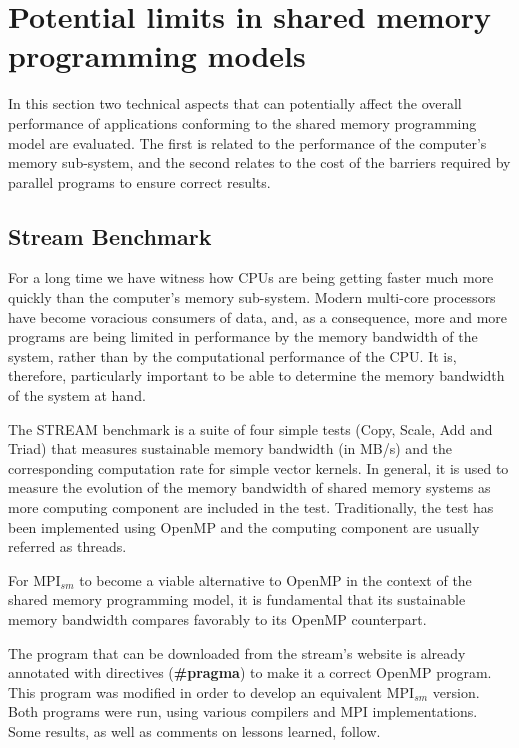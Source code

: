 \section{Potential limits in shared memory programming models} \label{potentialLimits}

In this section two technical aspects that can potentially affect the overall performance of applications conforming to the shared memory programming model are evaluated. The first is related to the performance of the computer's memory sub-system, and the second relates to the cost of the barriers required by parallel programs to ensure correct results.


\subsection*{Stream Benchmark}

For a long time we have witness how CPUs are being getting faster much more quickly than the computer's memory sub-system. Modern multi-core processors have become voracious consumers of data, and, as a consequence, more and more programs are being limited in performance by the memory bandwidth of the system, rather than by the computational performance of the CPU\cite{McCalpin2007}. It is, therefore, particularly important to be able to determine the memory bandwidth of the system at hand. 

\medskip


The STREAM benchmark\cite{McCalpin2007} is a suite of four simple tests (Copy, Scale, Add and Triad) that measures sustainable memory bandwidth (in MB/s) and the corresponding computation rate for simple vector kernels. In general, it is used to measure the evolution of the memory bandwidth of shared memory systems as more computing component are included in the test. Traditionally, the test has been implemented using OpenMP and the computing component are usually referred as threads.

\medskip

For MPI$_{sm}$ to become a viable alternative to OpenMP in the context of the shared memory programming model, it is fundamental that its sustainable memory bandwidth compares favorably to its OpenMP counterpart.

\medskip

The program that can be downloaded from the stream's website \cite{McCalpin2007} is already annotated with directives (\textbf{\#pragma}) to make it a correct OpenMP program. This program was modified in order to develop an equivalent  MPI$_{sm}$ version. Both programs were run, using various compilers and MPI implementations. Some results, as well as comments on lessons learned, follow.

